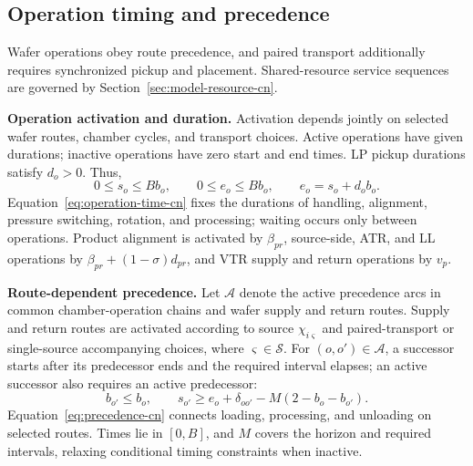 \documentclass[final,5p,times,twocolumn]{elsarticle}
\begin{document}
\subsection{Operation timing and precedence}
\label{sec:model-time-cn}
Wafer operations obey route precedence, and paired transport additionally requires synchronized pickup and placement. Shared-resource service sequences are governed by Section~\ref{sec:model-resource-cn}.

\noindent\textbf{Operation activation and duration.}
Activation depends jointly on selected wafer routes, chamber cycles, and transport choices. Active operations have given durations; inactive operations have zero start and end times. LP pickup durations satisfy $d_o>0$. Thus,
\begin{equation}
0\le s_o\le B b_o,\qquad
0\le e_o\le B b_o,\qquad
e_o=s_o+d_ob_o.
\label{eq:operation-time-cn}
\end{equation}
Equation~\eqref{eq:operation-time-cn} fixes the durations of handling, alignment, pressure switching, rotation, and processing; waiting occurs only between operations. Product alignment is activated by $\beta_{pr}$, source-side, ATR, and LL operations by $\beta_{pr}+(1-\sigma)d_{pr}$, and VTR supply and return operations by $v_p$.

\noindent\textbf{Route-dependent precedence.}
Let $\mathcal A$ denote the active precedence arcs in common chamber-operation chains and wafer supply and return routes. Supply and return routes are activated according to source $\chi_{i\varsigma}$ and paired-transport or single-source accompanying choices, where $\varsigma\in\mathcal S$. For $(o,o')\in\mathcal A$, a successor starts after its predecessor ends and the required interval elapses; an active successor also requires an active predecessor:
\begin{equation}
b_{o'}\le b_o,\qquad
s_{o'}\ge e_o+\delta_{oo'}-M(2-b_o-b_{o'}).
\label{eq:precedence-cn}
\end{equation}
Equation~\eqref{eq:precedence-cn} connects loading, processing, and unloading on selected routes. Times lie in $[0,B]$, and $M$ covers the horizon and required intervals, relaxing conditional timing constraints when inactive.
\end{document}
